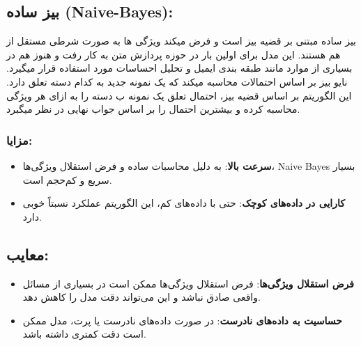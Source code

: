 \subsection{ بیز ساده (Naive-Bayes):}
بیز ساده مبتنی بر قضیه بیز است و فرض میکند ویژگی ها به صورت شرطی مستقل از هم هستند. این مدل برای اولین بار در حوزه پردازش متن به کار رفت و هنوز هم در بسیاری از موارد مانند طبقه بندی ایمیل و تحلیل احساسات مورد استفاده قرار میگیرد.
نایو بیز بر اساس احتمالات محاسبه میکند که یک نمونه جدید به کدام دسته تعلق دارد. این الگوریتم بر اساس قضیه بیز، احتمال تعلق یک نمونه ب دسته را به ازای هر ویژگی محاسبه کرده و بیشترین احتمال را بر اساس جواب نهایی در نظر میگبرد.
\subsubsection{مزایا:}

\begin{itemize}
	\item \textbf{سرعت بالا}: به دلیل محاسبات ساده و فرض استقلال ویژگی‌ها، Naive Bayes بسیار سریع و کم‌حجم است.
	\item \textbf{کارایی در داده‌های کوچک}: حتی با داده‌های کم، این الگوریتم عملکرد نسبتاً خوبی دارد.
\end{itemize}

\subsection{معایب:}

\begin{itemize}
	\item \textbf{فرض استقلال ویژگی‌ها}: فرض استقلال ویژگی‌ها ممکن است در بسیاری از مسائل واقعی صادق نباشد و این می‌تواند دقت مدل را کاهش دهد.
	\item \textbf{حساسیت به داده‌های نادرست}: در صورت داده‌های نادرست یا پرت، مدل ممکن است دقت کمتری داشته باشد.
\end{itemize}






